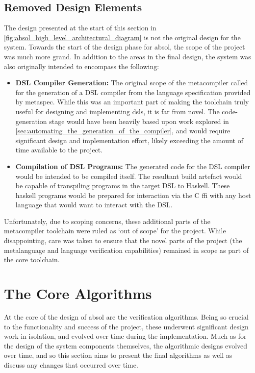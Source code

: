 
\subsection{Removed Design Elements} %
\label{sub:removed_design_elements}
The design presented at the start of this section in \autoref{fig:absol_high_level_architectural_diagram} is not the original design for the system.
Towards the start of the design phase for \gls{absol}, the scope of the project was much more grand. 
In addition to the areas in the final design, the system was also originally intended to encompass the following:
\begin{itemize}
    \item \textbf{DSL Compiler Generation:} The original scope of the metacompiler called for the generation of a DSL compiler from the language specification provided by \gls{metaspec}. 
    While this was an important part of making the toolchain truly useful for designing and implementing \glspl{dsl}, it is far from novel.
    The code-generation stage would have been heavily based upon work explored in \autoref{sec:automating_the_generation_of_the_compiler}, and would require significant design and implementation effort, likely exceeding the amount of time available to the project.
    \item \textbf{Compilation of DSL Programs:} The generated code for the DSL compiler would be intended to be compiled itself. 
    The resultant build artefact would be capable of transpiling programs in the target DSL to Haskell.
    These haskell programs would be prepared for interaction via the C \gls{ffi} with any host language that would want to interact with the DSL.
\end{itemize}

Unfortunately, due to scoping concerns, these additional parts of the metacompiler toolchain were ruled as `out of scope' for the project. 
While disappointing, care was taken to ensure that the novel parts of the project (the metalanguage and language verification capabilities) remained in scope as part of the core toolchain. 



\section{The Core Algorithms} %
\label{sec:the_core_algorithms}
At the core of the design of \gls{absol} are the verification algorithms. 
Being so crucial to the functionality and success of the project, these underwent significant design work in isolation, and evolved over time during the implementation.
Much as for the design of the system components themselves, the algorithmic designs evolved over time, and so this section aims to present the final algorithms as well as discuss any changes that occurred over time. \\

